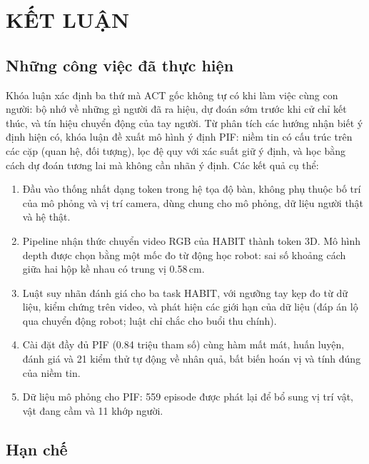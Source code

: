 \chapter{KẾT LUẬN}
\label{chap:conclusions}

\section{Những công việc đã thực hiện}

Khóa luận xác định ba thứ mà ACT gốc không tự có khi làm việc cùng con người: bộ nhớ về những gì người đã ra hiệu, dự đoán sớm trước khi cử chỉ kết thúc, và tín hiệu chuyển động của tay người. Từ phân tích các hướng nhận biết ý định hiện có, khóa luận đề xuất mô hình ý định PIF: niềm tin có cấu trúc trên các cặp (quan hệ, đối tượng), lọc đệ quy với xác suất giữ ý định, và học bằng cách dự đoán tương lai mà không cần nhãn ý định. Các kết quả cụ thể:
\begin{enumerate}
  \item Đầu vào thống nhất dạng token trong hệ tọa độ bàn, không phụ thuộc bố trí của mô phỏng và vị trí camera, dùng chung cho mô phỏng, dữ liệu người thật và hệ thật.
  \item Pipeline nhận thức chuyển video RGB của HABIT thành token 3D. Mô hình depth được chọn bằng một mốc đo từ động học robot: sai số khoảng cách giữa hai hộp kề nhau có trung vị 0.58\,cm.
  \item Luật suy nhãn đánh giá cho ba task HABIT, với ngưỡng tay kẹp đo từ dữ liệu, kiểm chứng trên video, và phát hiện các giới hạn của dữ liệu (đáp án lộ qua chuyển động robot; luật chỉ chắc cho buổi thu chính).
  \item Cài đặt đầy đủ PIF (0.84 triệu tham số) cùng hàm mất mát, huấn luyện, đánh giá và 21 kiểm thử tự động về nhân quả, bất biến hoán vị và tính đúng của niềm tin.
  \item Dữ liệu mô phỏng cho PIF: 559 episode được phát lại để bổ sung vị trí vật, vật đang cầm và 11 khớp người.
\end{enumerate}

\section{Hạn chế}

